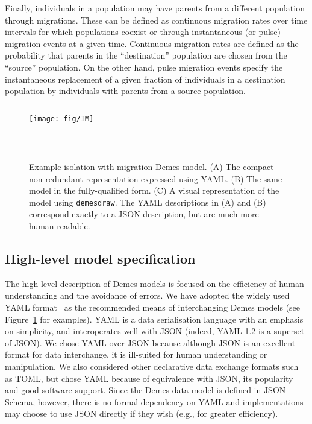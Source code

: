 \documentclass[11pt]{article}
\begin{document}
Finally, individuals in a population may have parents from a different
population through migrations. These can be defined as continuous migration
rates over time intervals for which populations coexist or through
instantaneous (or pulse) migration events at a given time. Continuous migration
rates are defined as the probability that parents in the ``destination''
population are chosen from the ``source'' population.
On the other hand, pulse
migration events specify the instantaneous replacement of a given fraction of
individuals in a destination population by individuals with parents from a
source population.

\begin{figure}
\begin{minipage}{0.44\textwidth}
\begin{tcolorbox}
\inputminted[fontsize=\scriptsize,linenos,numbersep=5pt]{yaml}{models/IM.yaml}
\end{tcolorbox}
\begin{tcolorbox}
\texttt{[image: fig/IM]}
\end{tcolorbox}
\end{minipage}\hfill
\begin{minipage}{0.54\textwidth}
\begin{tcolorbox}
\inputminted[fontsize=\scriptsize,linenos,numbersep=5pt]{yaml}{models/IM-resolved.yaml}
\end{tcolorbox}
\end{minipage}\\
\caption{\label{fig-example}
Example isolation-with-migration Demes model. (A) The compact non-redundant
representation expressed using YAML. (B) The same model in the fully-qualified
form. (C) A visual representation of the model using \texttt{demesdraw}.
The YAML descriptions in (A) and (B) correspond exactly to a JSON description,
but are much more human-readable.
}
\end{figure}


\subsection*{High-level model specification}

The high-level description of Demes models is focused on the efficiency of
human understanding and the avoidance of errors. We have adopted the widely
used YAML format~\citep{ben2009yaml} as the recommended means of interchanging
Demes models (see Figure~\ref{fig-example} for examples). YAML is a data
serialisation language with an emphasis on simplicity, and interoperates well
with JSON (indeed, YAML 1.2 is a superset of JSON). We chose YAML over JSON
because although JSON is an excellent format for data interchange, it is
ill-suited for human understanding or manipulation. We also considered other
declarative data exchange formats such as TOML,
but chose YAML because of equivalence with JSON,
its popularity and good software support.
Since the Demes data model is defined in JSON Schema,
however, there is no formal dependency on YAML and implementations may choose
to use JSON directly if they wish (e.g., for greater efficiency).
\end{document}
